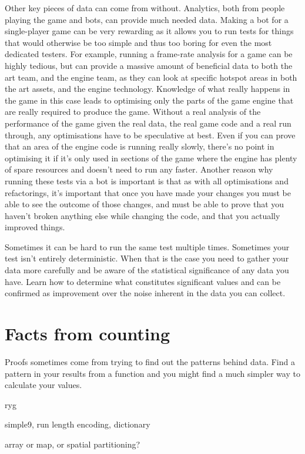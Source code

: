 Other key pieces of data can come from without. Analytics, both from people
playing the game and bots, can provide much needed data. Making a bot for a
single-player game can be very rewarding as it allows you to run tests for
things that would otherwise be too simple and thus too boring for even the most
dedicated testers. For example, running a frame-rate analysis for a game can be
highly tedious, but can provide a massive amount of beneficial data to both the
art team, and the engine team, as they can look at specific hotspot areas in
both the art assets, and the engine technology. Knowledge of what really
happens in the game in this case leads to optimising only the parts of the game
engine that are really required to produce the game. Without a real analysis of
the performance of the game given the real data, the real game code and a real
run through, any optimisations have to be speculative at best. Even if you can
prove that an area of the engine code is running really slowly, there's no
point in optimising it if it's only used in sections of the game where the
engine has plenty of spare resources and doesn't need to run any faster.
Another reason why running these tests via a bot is important is that as with
all optimisations and refactorings, it's important that once you have made your
changes you must be able to see the outcome of those changes, and must be able
to prove that you haven't broken anything else while changing the code, and
that you actually improved things.

Sometimes it can be hard to run the same test multiple times. Sometimes your
test isn't entirely deterministic. When that is the case you need to gather
your data more carefully and be aware of the statistical significance of any
data you have. Learn how to determine what constitutes significant values and
can be confirmed as improvement over the noise inherent in the data you can
collect.

\section{Facts from counting}

Proofs sometimes come from trying to find out the patterns behind data. Find a
pattern in your results from a function and you might find a much simpler way
to calculate your values.





ryg

simple9, run length encoding, dictionary

array or map, or spatial partitioning?


